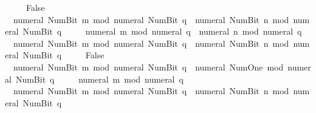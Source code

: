 \begin{isabellebody}
\ \ \ \ {\isasymlongleftrightarrow}\ False{\isachardoublequoteclose}\isanewline
\ \ {\isachardoublequoteopen}numeral\ {\isacharparenleft}{\kern0pt}Num{\isachardot}{\kern0pt}Bit{}\ m{\isacharparenright}{\kern0pt}\ mod\ numeral\ {\isacharparenleft}{\kern0pt}Num{\isachardot}{\kern0pt}Bit{}\ q{\isacharparenright}{\kern0pt}\ {\isacharequal}{\kern0pt}\ {\isacharparenleft}{\kern0pt}numeral\ {\isacharparenleft}{\kern0pt}Num{\isachardot}{\kern0pt}Bit{}\ n{\isacharparenright}{\kern0pt}\ mod\ numeral\ {\isacharparenleft}{\kern0pt}Num{\isachardot}{\kern0pt}Bit{}\ q{\isacharparenright}{\kern0pt}{\isacharparenright}{\kern0pt}\isanewline
\ \ \ \ {\isasymlongleftrightarrow}\ numeral\ m\ mod\ numeral\ q\ {\isacharequal}{\kern0pt}\ {\isacharparenleft}{\kern0pt}numeral\ n\ mod\ numeral\ q{\isacharparenright}{\kern0pt}{\isachardoublequoteclose}\isanewline
\ \ {\isachardoublequoteopen}numeral\ {\isacharparenleft}{\kern0pt}Num{\isachardot}{\kern0pt}Bit{}\ m{\isacharparenright}{\kern0pt}\ mod\ numeral\ {\isacharparenleft}{\kern0pt}Num{\isachardot}{\kern0pt}Bit{}\ q{\isacharparenright}{\kern0pt}\ {\isacharequal}{\kern0pt}\ {\isacharparenleft}{\kern0pt}numeral\ {\isacharparenleft}{\kern0pt}Num{\isachardot}{\kern0pt}Bit{}\ n{\isacharparenright}{\kern0pt}\ mod\ numeral\ {\isacharparenleft}{\kern0pt}Num{\isachardot}{\kern0pt}Bit{}\ q{\isacharparenright}{\kern0pt}{\isacharparenright}{\kern0pt}\isanewline
\ \ \ \ {\isasymlongleftrightarrow}\ False{\isachardoublequoteclose}\isanewline
\ \ {\isachardoublequoteopen}numeral\ {\isacharparenleft}{\kern0pt}Num{\isachardot}{\kern0pt}Bit{}\ m{\isacharparenright}{\kern0pt}\ mod\ numeral\ {\isacharparenleft}{\kern0pt}Num{\isachardot}{\kern0pt}Bit{}\ q{\isacharparenright}{\kern0pt}\ {\isacharequal}{\kern0pt}\ {\isacharparenleft}{\kern0pt}numeral\ Num{\isachardot}{\kern0pt}One\ mod\ numeral\ {\isacharparenleft}{\kern0pt}Num{\isachardot}{\kern0pt}Bit{}\ q{\isacharparenright}{\kern0pt}{\isacharparenright}{\kern0pt}\isanewline
\ \ \ \ {\isasymlongleftrightarrow}\ {\isacharparenleft}{\kern0pt}numeral\ m\ mod\ numeral\ q{\isacharparenright}{\kern0pt}\ {\isacharequal}{\kern0pt}\ {}{\isachardoublequoteclose}\isanewline
\ \ {\isachardoublequoteopen}numeral\ {\isacharparenleft}{\kern0pt}Num{\isachardot}{\kern0pt}Bit{}\ m{\isacharparenright}{\kern0pt}\ mod\ numeral\ {\isacharparenleft}{\kern0pt}Num{\isachardot}{\kern0pt}Bit{}\ q{\isacharparenright}{\kern0pt}\ {\isacharequal}{\kern0pt}\ {\isacharparenleft}{\kern0pt}numeral\ {\isacharparenleft}{\kern0pt}Num{\isachardot}{\kern0pt}Bit{}\ n{\isacharparenright}{\kern0pt}\ mod\ numeral\ {\isacharparenleft}{\kern0pt}Num{\isachardot}{\kern0pt}Bit{}\ q{\isacharparenright}{\kern0pt}{\isacharparenright}{\kern0pt}\isanewline

\end{isabellebody}
